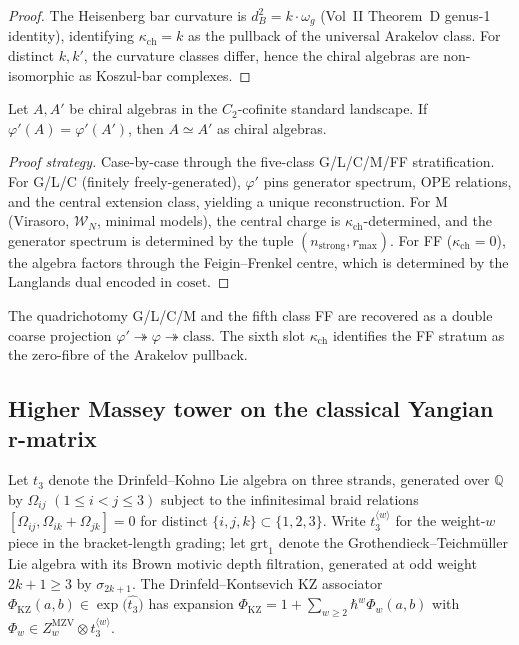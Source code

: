 \documentclass[11pt]{article}
\begin{document}
\begin{proof}
The Heisenberg bar curvature is $d_B^2 = k \cdot \omega_g$
(Vol~II Theorem~D genus-1 identity), identifying
$\kappa_{\mathrm{ch}} = k$ as the pullback of the universal Arakelov
class. For distinct $k, k'$, the curvature classes differ, hence
the chiral algebras are non-isomorphic as Koszul-bar complexes.
\end{proof}

\begin{theorem}
\label{thm:fingerprint-complete}
Let $A, A'$ be chiral algebras in the $C_2$-cofinite standard landscape.
If $\varphi'(A) = \varphi'(A')$, then $A \simeq A'$ as chiral algebras.
\end{theorem}

\begin{proof}[Proof strategy]
Case-by-case through the five-class G/L/C/M/FF stratification. For
G/L/C (finitely freely-generated), $\varphi'$ pins generator
spectrum, OPE relations, and the central extension class, yielding
a unique reconstruction. For M (Virasoro, $\mathcal{W}_N$, minimal
models), the central charge is $\kappa_{\mathrm{ch}}$-determined,
and the generator spectrum is determined by the tuple
$(n_{\mathrm{strong}}, r_{\max})$. For FF ($\kappa_{\mathrm{ch}} = 0$),
the algebra factors through the Feigin--Frenkel centre, which is
determined by the Langlands dual encoded in $\mathrm{coset}$.
\end{proof}

\begin{remark}
The quadrichotomy G/L/C/M and the fifth class FF are recovered as a
double coarse projection $\varphi' \twoheadrightarrow \varphi
\twoheadrightarrow \mathrm{class}$. The sixth slot
$\kappa_{\mathrm{ch}}$ identifies the FF stratum as the zero-fibre
of the Arakelov pullback.
\end{remark}

\subsection{Higher Massey tower on the classical Yangian r-matrix}
\label{subsec:higher-massey-tower}

Let $t_3$ denote the Drinfeld--Kohno Lie algebra on three strands,
generated over $\mathbb{Q}$ by $\Omega_{ij}$ $(1 \le i < j \le 3)$
subject to the infinitesimal braid relations
$[\Omega_{ij}, \Omega_{ik} + \Omega_{jk}] = 0$ for distinct
$\{i, j, k\} \subset \{1, 2, 3\}$. Write $t_3^{\langle w \rangle}$
for the weight-$w$ piece in the bracket-length grading; let
$\mathrm{grt}_1$ denote the Grothendieck--Teichm\"uller Lie algebra
with its Brown motivic depth filtration, generated at odd weight
$2k+1 \ge 3$ by $\sigma_{2k+1}$. The Drinfeld--Kontsevich KZ
associator
$\Phi_{\mathrm{KZ}}(a, b) \in \exp\!\bigl(\widehat{t_3}\bigr)$
has expansion
$\Phi_{\mathrm{KZ}} = 1 + \sum_{w \ge 2} \hbar^w \Phi_w(a, b)$
with $\Phi_w \in Z_w^{\mathrm{MZV}} \otimes t_3^{\langle w \rangle}$.
\end{document}
